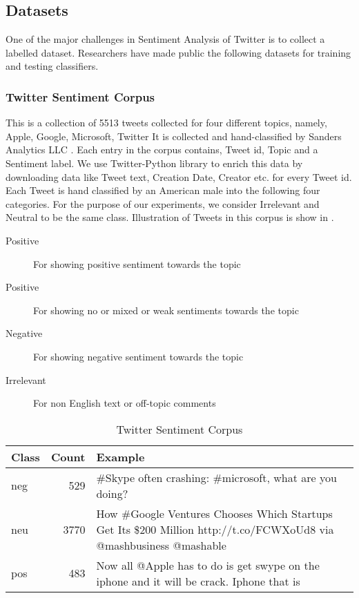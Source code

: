 \subsection{Datasets}
One of the major challenges in Sentiment Analysis of Twitter is to collect a
labelled dataset. Researchers have made public the following datasets for
training and testing classifiers.

\subsubsection{Twitter Sentiment Corpus} This is a collection of 5513 tweets
collected for four different topics, namely, Apple, Google, Microsoft, Twitter
It is collected and hand-classified by Sanders Analytics LLC \cite{San}. Each
entry in the corpus contains, Tweet id, Topic and a Sentiment label. We use
Twitter-Python library to enrich this data by downloading data like Tweet text,
Creation Date, Creator etc. for every Tweet id. Each Tweet is
hand classified by an American male into the following four categories. For the
purpose of our experiments, we consider Irrelevant and Neutral to be the same
class. Illustration of Tweets in this corpus is show in .

\begin{description}
	\item[Positive] {For showing positive sentiment towards the topic}
	\item[Positive] {For showing no or mixed or weak sentiments towards the topic}
	\item[Negative] {For showing negative sentiment towards the topic}	
	\item[Irrelevant] {For non English text or off-topic comments}
\end{description}

\begin{table}[h!]
\centering

\begin{tabular}{|l|r|p{}|}
\hline
Class & Count & Example \\\hline
neg & 529 & {{\#}Skype often crashing: {\#}microsoft, what are you doing?} \\\hline
neu & 3770 & {How {\#}Google Ventures Chooses Which Startups Get Its \$200
				Million http://t.co/FCWXoUd8 via @mashbusiness @mashable} \\\hline
pos & 483 & {Now all @Apple has to do is get swype on the iphone and
				it will be crack. Iphone that is} \\\hline

\end{tabular}

\caption{Twitter Sentiment Corpus}
\label{tab:TSC}
\end{table}

